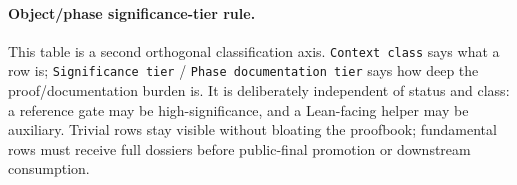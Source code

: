 \paragraph{Object/phase significance-tier rule.} This table is a second orthogonal classification axis. \texttt{Context class} says what a row is; \texttt{Significance tier} / \texttt{Phase documentation tier} says how deep the proof/documentation burden is. It is deliberately independent of status and class: a reference gate may be high-significance, and a Lean-facing helper may be auxiliary. Trivial rows stay visible without bloating the proofbook; fundamental rows must receive full dossiers before public-final promotion or downstream consumption.

